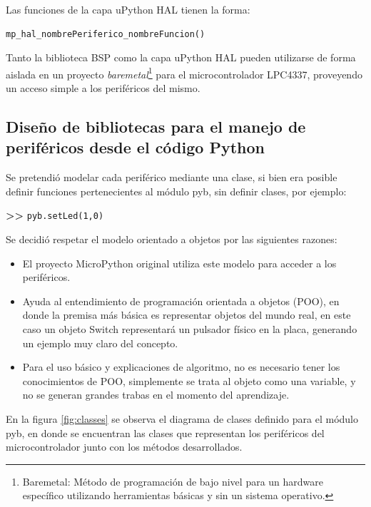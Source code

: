 Las funciones de la capa uPython HAL tienen la forma:

\begin{verbatim}
mp_hal_nombrePeriferico_nombreFuncion()
\end{verbatim}

Tanto la biblioteca BSP como la capa uPython HAL pueden utilizarse de forma aislada en un proyecto \textit{baremetal}\footnote{Baremetal: Método de programación de bajo nivel para un hardware específico utilizando herramientas básicas y sin un sistema operativo.} para el microcontrolador LPC4337, proveyendo un acceso simple a los periféricos del mismo.


\subsection{Diseño de bibliotecas para el manejo de periféricos desde el código Python}

Se pretendió modelar cada periférico mediante una clase, si bien era posible definir funciones pertenecientes al módulo pyb, sin definir clases, por ejemplo:

\textbf{{\fontsize{16}{16}\selectfont \textgreater\textgreater}} \texttt{pyb.setLed(1,0)}

Se decidió respetar el modelo orientado a objetos por las siguientes razones:

\begin{itemize}
	\item El proyecto MicroPython original utiliza este modelo para acceder a los periféricos.
	\item Ayuda al entendimiento de programación orientada a objetos (POO), en donde la premisa más básica es representar objetos del mundo real, en este caso un objeto Switch representará un pulsador físico en la placa, generando un ejemplo muy claro del concepto.
	\item Para el uso básico y explicaciones de algoritmo, no es necesario tener los conocimientos de POO, simplemente se trata al objeto como una variable, y no se generan grandes trabas en el momento del aprendizaje.
\end{itemize}

En la figura \ref{fig:classes} se observa el diagrama de clases definido para el módulo pyb, en donde se encuentran las clases que representan los periféricos del microcontrolador junto con los métodos desarrollados.

